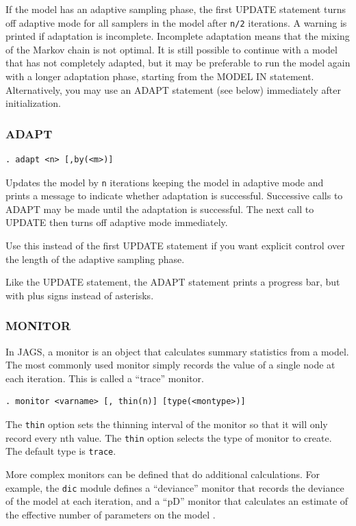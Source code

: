 \documentclass[11pt, a4paper, titlepage]{report}
\newcommand{\JAGS}{\textsf{JAGS}}
\begin{document}
If the model has an adaptive sampling phase, the first UPDATE
statement turns off adaptive mode for all samplers in the model after
\texttt{n/2} iterations. A warning is printed if adaptation is
incomplete. Incomplete adaptation means that the mixing of the Markov
chain is not optimal. It is still possible to continue with a model
that has not completely adapted, but it may be preferable to run the
model again with a longer adaptation phase, starting from the MODEL IN
statement. Alternatively, you may use an ADAPT statement (see below)
immediately after initialization.

\subsubsection{ADAPT}
\label{section:adapt}

\begin{verbatim}
. adapt <n> [,by(<m>)]
\end{verbatim}
Updates the model by \texttt{n} iterations keeping the model in
adaptive mode and prints a message to indicate whether adaptation is
successful.  Successive calls to ADAPT may be made until the
adaptation is successful. The next call to UPDATE then turns off
adaptive mode immediately.

Use this instead of the first UPDATE statement if you want explicit
control over the length of the adaptive sampling phase.

Like the UPDATE statement, the ADAPT statement prints a progress
bar, but with plus signs instead of asterisks.

\subsubsection{MONITOR}
\label{section:monitor}

In \JAGS, a monitor is an object that calculates summary statistics
from a model.  The most commonly used monitor simply records the value
of a single node at each iteration.  This is called a ``trace''
monitor. 
\begin{verbatim}
. monitor <varname> [, thin(n)] [type(<montype>)]
\end{verbatim}
The \texttt{thin} option sets the thinning interval of the monitor so
that it will only record every nth value. The \texttt{thin} option 
selects the type of monitor to create. The default type is \texttt{trace}.

More complex monitors can be defined that do additional calculations.
For example, the \texttt{dic} module defines a ``deviance'' monitor that
records the deviance of the model at each iteration, and a ``pD''
monitor that calculates an estimate of the effective number of
parameters on the model \citep{spiegelhalter:etal:2002}.  
\end{document}
